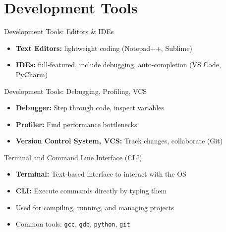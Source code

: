 \documentclass[12pt, aspectratio=169]{beamer}
\begin{document}
    \section{Development Tools}


    \begin{frame}{Development Tools: Editors \& IDEs}
        \begin{itemize}
            \item \textbf{Text Editors:} lightweight coding (Notepad++, Sublime)
            \item \textbf{IDEs:} full-featured, include debugging, auto-completion (VS Code, PyCharm)
        \end{itemize}
    \end{frame}


    \begin{frame}{Development Tools: Debugging, Profiling, VCS}
        \begin{itemize}
            \item \textbf{Debugger:} Step through code, inspect variables
            \item \textbf{Profiler:} Find performance bottlenecks
            \item \textbf{Version Control System, VCS:} Track changes, collaborate (Git)
        \end{itemize}
    \end{frame}


    \begin{frame}{Terminal and Command Line Interface (CLI)}
        \begin{itemize}
            \item \textbf{Terminal:} Text-based interface to interact with the OS
            \item \textbf{CLI:} Execute commands directly by typing them
            \item Used for compiling, running, and managing projects
            \item Common tools: \texttt{gcc}, \texttt{gdb}, \texttt{python}, \texttt{git}
        \end{itemize}
    \end{frame}
\end{document}
